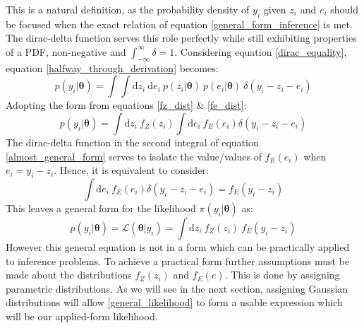 \begin{tcolorbox}
\end{tcolorbox}




\begin{tcolorbox}
This is a natural definition, as the probability density of $y_i$ given $z_i$ and $e_i$ should be focused when the exact relation of equation \ref{general_form_inference} is met. The dirac-delta function serves this role perfectly while still exhibiting properties of a PDF, non-negative and $\int_{-\infty}^{\infty}\delta = 1$. Considering equation \ref{dirac_equality}, equation \ref{halfway_through_derivation} becomes:
\begin{equation}
p(y_i|\bm{\theta}) = \int \int \text{d}z_i\ \text{d}e_i\ p(z_i|\bm{\theta})\ p(e_i|\bm{\theta})\ \delta(y_i-z_i-e_i)
\end{equation}
Adopting the form from equations \ref{fz_dist} \& \ref{fe_dist}:
\begin{equation}
p(y_i|\bm{\theta}) = \int \text{d}z_i\ f_Z(z_i) \int \text{d}e_i\ f_E(e_i) \delta(y_i-z_i-e_i)
\label{almost_general_form}
\end{equation}
The dirac-delta function in the second integral of equation \ref{almost_general_form} serves to isolate the value/values of $f_E(e_i)$ when $e_i = y_i - z_i$. Hence, it is equivalent to consider:
\begin{equation}
\int \text{d}e_i\ f_E(e_i) \delta(y_i-z_i-e_i) = f_E(y_i - z_i)
\end{equation}
This leaves a general form for the likelihood $\pi(y_i|\bm{\theta})$ as: 
\begin{equation}
p(y_i|\bm{\theta}) = \mathcal{L}(\bm{\theta}|y_i) = \int \text{d}z_i\ f_Z(z_i)\ f_E(y_i - z_i)
\label{general_likelihood}
\end{equation}
However this general equation is not in a form which can be practically applied to inference problems. To achieve a practical form further assumptions must be made about the distributions $f_Z(z_i)$ and $f_E(e)$. This is done by assigning parametric distributions. As we will see in the next section, assigning Gaussian distributions will allow \ref{general_likelihood} to form a usable expression which will be our applied-form likelihood.


\end{tcolorbox}
